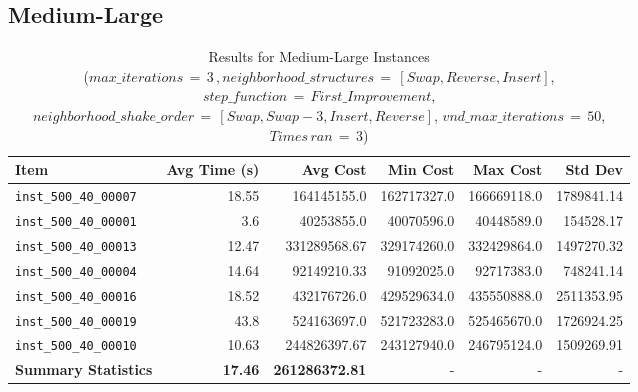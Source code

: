 \documentclass{article}
\begin{document}
\subsection*{Medium-Large}
\begin{table}[H]
	\centering
	   \caption{Results for Medium-Large Instances \\($max\_iterations \,{=}\, 3\,, neighborhood\_structures \,{=}\, [Swap, Reverse, Insert]$, $step\_function \,{=}\, First\_Improvement$, $neighborhood\_shake\_order \,{=}\, [Swap, Swap-3, Insert, Reverse]$, $vnd\_max\_iterations \,{=}\, 50$, $Times\, ran \,{=}\, 3$)}
        \hspace*{-2cm}
	\begin{tabular}{lrrrrr}
		\toprule
		\textbf{Item} & \textbf{Avg Time (s)} & \textbf{Avg Cost} & \textbf{Min Cost} & \textbf{Max Cost} & \textbf{Std Dev}\\
		\midrule
		\texttt{inst\_500\_40\_00007} & 18.55 & 164145155.0 & 162717327.0 & 166669118.0 & 1789841.14 \\ \texttt{inst\_500\_40\_00001} & 3.6 & 40253855.0 & 40070596.0 & 40448589.0 & 154528.17 \\ \texttt{inst\_500\_40\_00013} & 12.47 & 331289568.67 & 329174260.0 & 332429864.0 & 1497270.32 \\ \texttt{inst\_500\_40\_00004} & 14.64 & 92149210.33 & 91092025.0 & 92717383.0 & 748241.14 \\ \texttt{inst\_500\_40\_00016} & 18.52 & 432176726.0 & 429529634.0 & 435550888.0 & 2511353.95 \\ \texttt{inst\_500\_40\_00019} & 43.8 & 524163697.0 & 521723283.0 & 525465670.0 & 1726924.25 \\ \texttt{inst\_500\_40\_00010} & 10.63 & 244826397.67 & 243127940.0 & 246795124.0 & 1509269.91 \\ \midrule \textbf{Summary Statistics} & \textbf{17.46} & \textbf{261286372.81} & - & - & - \\
		\bottomrule
	\end{tabular}
	\label{tab:medium_large_performance_metrics_gvns}
\end{table}
\end{document}
